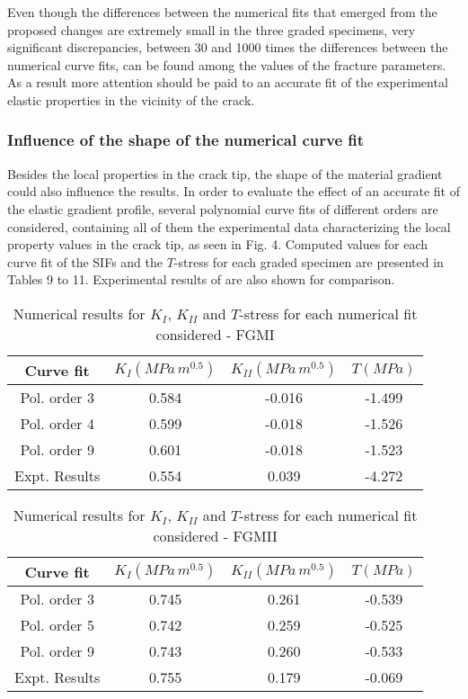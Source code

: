 Even though the differences between the numerical fits that emerged from the proposed changes are extremely small in the three graded specimens, very significant discrepancies, between 30 and 1000 times the differences between the numerical curve fits, can be found among the values of the fracture parameters. As a result more attention should be paid to an accurate fit of the experimental elastic properties in the vicinity of the crack.

\subsubsection{Influence of the shape of the numerical curve fit}

Besides the local properties in the crack tip, the shape of the material gradient could also influence the results. In order to evaluate the effect of an accurate fit of the elastic gradient profile, several polynomial curve fits of different orders are considered, containing all of them the experimental data characterizing the local property values in the crack tip, as seen in Fig. 4. Computed values for each curve fit of the SIFs and the $T$-stress for each graded specimen are presented in Tables 9 to 11. Experimental results of \cite{Abanto-Bueno2006} are also shown for comparison.

\begin{table*}[htbp]
\caption{Numerical results for $K_I$, $K_{II}$ and $T$-stress for each numerical fit considered - FGMI}
\centering
\begin{tabular}{c c c c} 
\hline \hline
Curve fit & $K_I (M\!Pa\,m^{0.5})$ & $K_{II} (M\!Pa\,m^{0.5})$ & $T (M\!Pa)$ \\
 \hline
 Pol. order 3 & 0.584 & -0.016 & -1.499\\
 Pol. order 4 & 0.599 & -0.018 & -1.526\\
 Pol. order 9 & 0.601 & -0.018 & -1.523\\
  \hline
 Expt. Results & 0.554 & 0.039 & -4.272\\
 \hline \hline 
\end{tabular}
\label{tab:Table9}
\end{table*}
\vspace{10pt}

\begin{table*}[htbp]
\caption{Numerical results for $K_I$, $K_{II}$ and $T$-stress for each numerical fit considered - FGMII}
\centering
\begin{tabular}{c c c c} 
\hline \hline
Curve fit & $K_I (M\!Pa\,m^{0.5})$ & $K_{II} (M\!Pa\,m^{0.5})$ & $T (M\!Pa)$ \\
 \hline
 Pol. order 3 & 0.745 & 0.261 & -0.539\\
 Pol. order 5 & 0.742 & 0.259 & -0.525\\
 Pol. order 9 & 0.743 & 0.260 & -0.533\\
  \hline
 Expt. Results & 0.755 & 0.179 & -0.069\\
 \hline \hline 
\end{tabular}
\label{tab:Table10}
\end{table*}
\vspace{10pt}

